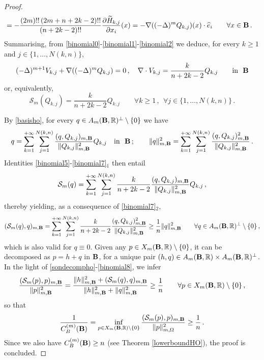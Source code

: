 \documentclass[11pt]{article}
\theoremstyle{plain}
\theoremstyle{definition}
\numberwithin{equation}{section}
\newcommand{\B}{{\bf B}}
\begin{document}
\begin{proof}
\begin{equation}
\begin{aligned}
		& = - \dfrac{(2m)!! \, (2m+n+2k-2)!!}{(n+2k-2)!!} \dfrac{\partial \widetilde{H}_{k,j}}{\partial x_{i}}(x) = - \nabla ((- \Delta)^{m} Q_{k,j})(x) \cdot \widehat{e}_{i} \qquad \forall x \in \B \, .
	\end{aligned}
\end{equation}
Summarising, from \eqref{binomial0}-\eqref{binomial1}-\eqref{binomial2} we deduce, for every $k \geq 1$ and $j \in \{1,\ldots,N(k,n)\}$,
\begin{equation} \label{binomial4}
(-\Delta)^{m+1} V_{k,j} + \nabla ((- \Delta)^{m} Q_{k,j}) = 0 \, , \quad \nabla \cdot V_{k,j} = \dfrac{k}{n+2k-2} Q_{k,j} \qquad \text{in} \ \ \B
\end{equation}
or, equivalently,
\begin{equation} \label{binomial5}
\mathcal{S}_{m}(Q_{k,j}) = \dfrac{k}{n+2k-2} Q_{k,j} \qquad \forall k \geq 1 \, , \ \ \forall j \in \{1,\ldots,N(k,n)\} \, .
\end{equation}

By \eqref{basisho}, for every $q \in A_{m}(\B, \mathbb{R})^{\perp} \setminus \{0\}$ we have
\begin{equation} \label{binomial7}
q = \sum_{k=1}^{+\infty} \sum_{j=1}^{N(k,n)} \dfrac{(q,Q_{k,j})_{m,\B}}{\| Q_{k,j} \|_{m,\B}^{2}} Q_{k,j} \quad \text{in} \ \ \B \, ; \qquad \| q \|_{m,\B}^{2} = \sum_{k=1}^{+\infty} \sum_{j=1}^{N(k,n)} \dfrac{(q,Q_{k,j})^{2}_{m,\B}}{\| Q_{k,j} \|_{m,\B}^{2}} \, .
\end{equation}
Identities \eqref{binomial5}-\eqref{binomial7}$_1$ then entail
$$
\mathcal{S}_{m}(q) = \sum_{k=1}^{+\infty} \sum_{j=1}^{N(k,n)} \dfrac{k}{n+2k-2} \dfrac{(q,Q_{k,j})_{m,\B}}{\| Q_{k,j} \|_{m,\B}^{2}} Q_{k,j} \, ,
$$
thereby yielding, as a consequence of \eqref{binomial7}$_2$,
\begin{equation} \label{binomial8}
(\mathcal{S}_{m}(q),q)_{m, \B} = \sum_{k=1}^{+\infty} \sum_{j=1}^{N(k,n)} \dfrac{k}{n+2k-2} \dfrac{(q,Q_{k,j})^{2}_{m,\B}}{\| Q_{k,j} \|_{m,\B}^{2}} \geq \dfrac{1}{n} \| q \|_{m,\B}^{2} \qquad \forall q \in A_{m}(\B, \mathbb{R})^{\perp} \setminus \{0\} \, ,
\end{equation}
which is also valid for $q \equiv 0$. Given any $p \in X_{m}(\B, \mathbb{R}) \setminus \{0\}$, it can be decomposed as $p = h + q$ in $\B$, for a unique pair $(h,q) \in A_{m}(\B, \mathbb{R}) \times A_{m}(\B, \mathbb{R})^{\perp}$. In the light of \eqref{sondecompho}-\eqref{binomial8}, we infer
$$
\dfrac{(\mathcal{S}_{m}(p),p)_{m, \B}}{\|p\|_{m,\B}^2} = \dfrac{\|h\|_{m,\B}^2 + (\mathcal{S}_{m}(q),q)_{m, \B}}{\|h\|_{m,\B}^2 + \|q\|_{m,\B}^2} \geq \dfrac{1}{n} \qquad \forall p \in X_{m}(\B, \mathbb{R}) \setminus \{0\} \, ,
$$
so that
$$
\dfrac{1}{C^{(m)}_{B}(\B)} = \inf_{p \in X_{m}(\B, \mathbb{R}) \setminus \{0\}} \dfrac{(\mathcal{S}_{m}(p),p)_{m, \B}}{\|p\|_{m,\Omega}^2} \geq \dfrac{1}{n} \, .
$$
Since we also have $C^{(m)}_{B}(\B) \geq n$ (see Theorem \ref{lowerboundHO}), the proof is concluded.
\end{proof}
\end{document}
